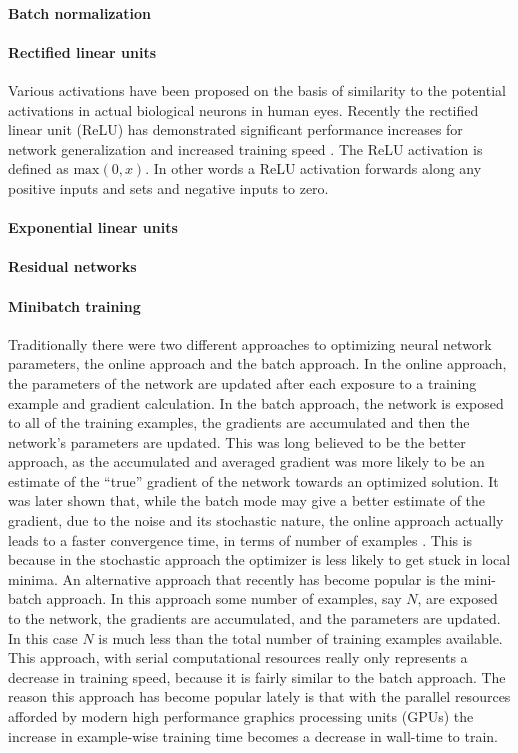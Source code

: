 \paragraph{Batch normalization}
\paragraph{Rectified linear units}
Various activations have been proposed on the basis of similarity to the
potential activations in actual biological neurons in human eyes. Recently the
rectified linear unit (ReLU) has demonstrated significant performance
increases for network generalization and increased training speed
\cite{glorot2011deep,dahl2013improving}. The ReLU activation is defined as
$\text{max}(0,x)$. In other words a ReLU activation forwards along any
positive inputs and sets and negative inputs to zero.
\paragraph{Exponential linear units}
\paragraph{Residual networks}
\paragraph{Minibatch training}
Traditionally there were two different approaches to optimizing neural
network parameters, the online approach and the batch approach. In the online
approach, the parameters of the network are updated after each exposure to a
training example and gradient calculation. In the batch approach, the network
is exposed to all of the training examples, the gradients are accumulated and
then the network's parameters are updated. This was long believed to be the
better approach, as the accumulated and averaged gradient was more likely to
be an estimate of the ``true'' gradient of the network towards an optimized
solution. It was later shown  that, while the batch mode may give a better
estimate of the gradient, due to the noise and its stochastic nature, the
online approach actually leads to a faster convergence time, in terms of
number of examples \cite{Wilson:2003:GIB:965268.965272}. This is because in
the stochastic approach the optimizer is less likely to get stuck in local
minima. An alternative approach that recently has become popular is the mini-
batch approach. In this approach some number of examples, say $N$, are exposed
to the network, the gradients are accumulated, and the parameters are updated.
In this case $N$ is much less than the total number of training examples
available. This approach, with serial computational resources really only
represents a decrease in training speed, because it is fairly similar to the
batch approach. The reason this approach has become popular lately is that
with the parallel resources afforded by modern high performance graphics
processing units (GPUs) the increase in example-wise training time becomes a
decrease in wall-time to train.

